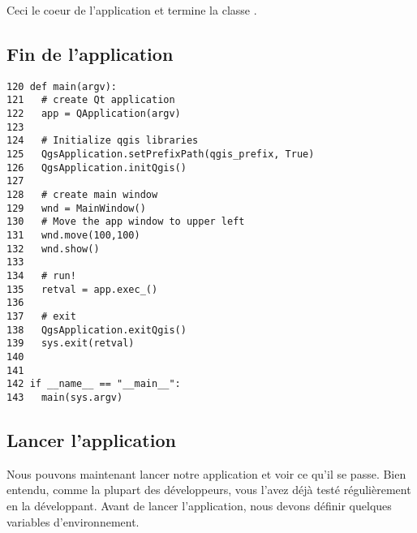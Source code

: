 Ceci le coeur de l'application et termine la classe .

\subsection{Fin de l'application}


\begin{verbatim}
120 def main(argv):
121   # create Qt application
122   app = QApplication(argv)
123 
124   # Initialize qgis libraries
125   QgsApplication.setPrefixPath(qgis_prefix, True)
126   QgsApplication.initQgis()
127 
128   # create main window
129   wnd = MainWindow()
130   # Move the app window to upper left
131   wnd.move(100,100)
132   wnd.show()
133 
134   # run!
135   retval = app.exec_()
136   
137   # exit
138   QgsApplication.exitQgis()
139   sys.exit(retval)
140 
141 
142 if __name__ == "__main__":
143   main(sys.argv)
\end{verbatim}

\subsection{Lancer l'application}

Nous pouvons maintenant lancer notre application et voir ce qu'il se passe. Bien entendu, comme la plupart des développeurs, vous l'avez déjà testé régulièrement en la développant.
Avant de lancer l'application, nous devons définir quelques variables d'environnement.

